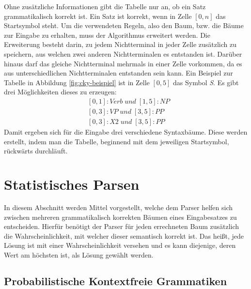 Ohne zusätzliche Informationen gibt die Tabelle nur an, ob ein Satz grammatikalisch korrekt ist. Ein Satz ist korrekt, wenn in Zelle \([0, n]\) das Startsymbol steht. Um die verwendeten Regeln, also den Baum, bzw. die Bäume zur Eingabe zu erhalten, muss der Algorithmus erweitert werden. Die Erweiterung besteht darin, zu jedem Nichtterminal in jeder Zelle zusätzlich zu speichern, aus welchen zwei anderen Nichtterminalen es entstanden ist. Darüber hinaus darf das gleiche Nichtterminal mehrmals in einer Zelle vorkommen, da es aus unterschiedlichen Nichtterminalen entstanden sein kann. Ein Beispiel zur Tabelle in Abbildung \ref{fig:cky-beispiel} ist in Zelle \([0, 5]\) das Symbol \textit{S}. Es gibt drei Möglichkeiten dieses zu erzeugen: 
\begin{align}
& [0, 1]:Verb \; und\; [1, 5]:NP \nonumber \\ & [0, 3]:VP \; und \; [3, 5]:PP \nonumber \\ & [0, 3]:X2 \; und \; [3, 5]:PP \nonumber
\end{align}
Damit ergeben sich für die Eingabe drei verschiedene Syntaxbäume. Diese werden erstellt, indem man die Tabelle, beginnend mit dem jeweiligen Startsymbol, rückwärts durchläuft.

\section{Statistisches Parsen}
\label{sec:nlp:stat-parsen}

In diesem Abschnitt werden Mittel vorgestellt, welche dem Parser helfen sich zwischen mehreren grammatikalisch korrekten Bäumen eines Eingabesatzes zu entscheiden. Hierfür benötigt der Parser für jeden errechneten Baum zusätzlich die Wahrscheinlichkeit, mit welcher dieser semantisch korrekt ist. Das heißt, jede Lösung ist mit einer Wahrscheinlichkeit versehen und es kann diejenige, deren Wert am höchsten ist, als Lösung gewählt werden. 

\subsection{Probabilistische Kontextfreie Grammatiken}
\label{sec:nlp:stat-parsen:pcfg}

